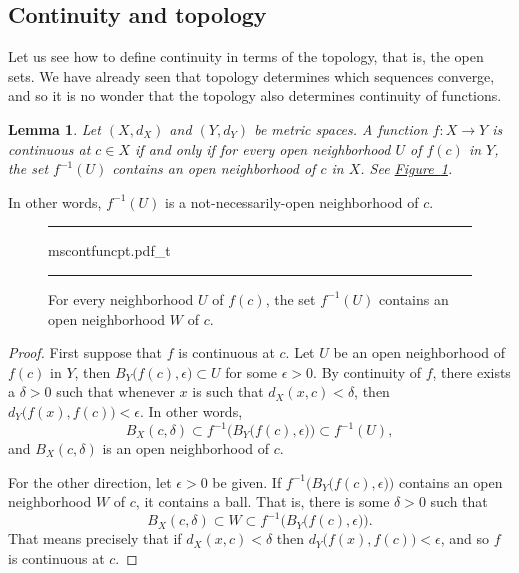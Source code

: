 \documentclass[12pt,openany]{book}
\theoremstyle{plain}
\newtheorem{lemma}[thm]{Lemma}
\theoremstyle{remark}
\theoremstyle{definition}
\newenvironment{myfig}{%
\begin{figure}[h!t]
\noindent\rule{\textwidth}{0.5pt}\vspace{12pt}\par\centering}%
{\par\noindent\rule{\textwidth}{0.5pt}
\end{figure}}
\theoremstyle{exercise}
\theoremstyle{example}
\newcommand{\figureref}[1]{\hyperref[#1]{Figure~\ref*{#1}}}
\begin{document}
\subsection{Continuity and topology}

Let us see how to define continuity in terms of the topology, that is,
the open sets.  We have already seen that topology determines which 
sequences converge, and so it is no wonder that the topology also
determines continuity of functions.

\begin{lemma} \label{lemma:mstopocontloc}
Let $(X,d_X)$ and $(Y,d_Y)$ be metric spaces.
A function $f \colon X \to Y$ is continuous at $c \in X$
if and only if for every open neighborhood $U$ of $f(c)$ in $Y$, the set
$f^{-1}(U)$ contains an open neighborhood of $c$ in $X$.
See \figureref{fig:mscontfuncpt}.
\end{lemma}

In other words, $f^{-1}(U)$ is a not-necessarily-open neighborhood of $c$.

\begin{myfig}
{mscontfuncpt.pdf_t}
\caption{For every neighborhood $U$ of $f(c)$, the set $f^{-1}(U)$ contains an open
neighborhood $W$ of $c$.\label{fig:mscontfuncpt}}
\end{myfig}

\begin{proof}
First suppose that $f$ is continuous at $c$.
Let $U$ be an open neighborhood of $f(c)$
in $Y$, then $B_Y\bigl(f(c),\epsilon\bigr) \subset U$ for some $\epsilon >
0$.  By continuity of $f$, there exists a $\delta > 0$
such that whenever $x$ is such that $d_X(x,c) < \delta$, then
$d_Y\bigl(f(x),f(c)\bigr) < \epsilon$.  In other words,
\begin{equation*}
B_X(c,\delta) \subset f^{-1}\bigl(B_Y\bigl(f(c),\epsilon\bigr)\bigr) \subset
f^{-1}(U) ,
\end{equation*}
and $B_X(c,\delta)$ is an open neighborhood of $c$.

For the other direction,
let $\epsilon > 0$ be given.  If
$f^{-1}\bigl(B_Y\bigl(f(c),\epsilon\bigr)\bigr)$ contains an open
neighborhood $W$ of $c$, it contains a ball.  That is, there is some $\delta > 0$
such that
\begin{equation*}
B_X(c,\delta) \subset W \subset f^{-1}\bigl(B_Y\bigl(f(c),\epsilon\bigr)\bigr) .
\end{equation*}
That means precisely that if $d_X(x,c) < \delta$ then $d_Y\bigl(f(x),f(c)\bigr)
< \epsilon$, and so $f$ is continuous at $c$.
\end{proof}
\end{document}
